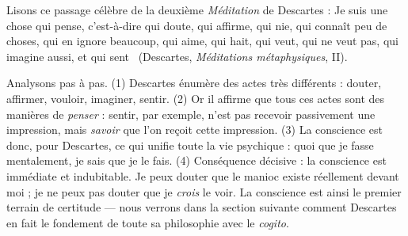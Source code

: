 \documentclass[11pt]{article}
\begin{document}
\begin{experience}
Lisons ce passage célèbre de la deuxième \emph{Méditation} de Descartes : \guillemotleft Je suis une chose qui pense, c'est-à-dire qui doute, qui affirme, qui nie, qui connaît peu de choses, qui en ignore beaucoup, qui aime, qui hait, qui veut, qui ne veut pas, qui imagine aussi, et qui sent \guillemotright\ (Descartes, \emph{Méditations métaphysiques}, II).

Analysons pas à pas. (1) Descartes énumère des actes très différents : douter, affirmer, vouloir, imaginer, sentir. (2) Or il affirme que tous ces actes sont des manières de \emph{penser} : sentir, par exemple, n'est pas recevoir passivement une impression, mais \emph{savoir} que l'on reçoit cette impression. (3) La conscience est donc, pour Descartes, ce qui unifie toute la vie psychique : quoi que je fasse mentalement, je sais que je le fais. (4) Conséquence décisive : la conscience est immédiate et indubitable. Je peux douter que le manioc existe réellement devant moi ; je ne peux pas douter que je \emph{crois} le voir. La conscience est ainsi le premier terrain de certitude — nous verrons dans la section suivante comment Descartes en fait le fondement de toute sa philosophie avec le \emph{cogito}.
\end{experience}
\end{document}
